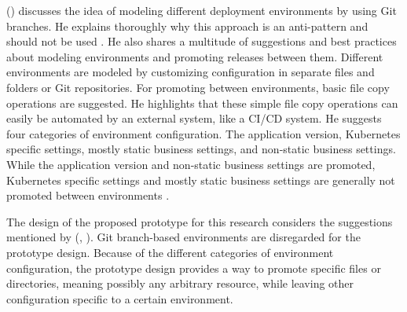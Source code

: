 \citeauthor{codefreshStopUsingBranchesGitOpsEnvironments} (\citeyear{codefreshStopUsingBranchesGitOpsEnvironments})
discusses
the idea of
modeling different deployment environments by using Git branches.
He
explains thoroughly why this approach is an anti-pattern and should not be used
\autocite{codefreshStopUsingBranchesGitOpsEnvironments}.
He
also shares
a multitude of suggestions and best practices
about modeling environments and promoting releases between them.
Different environments are modeled by customizing configuration in separate files and folders or Git repositories.
For promoting between environments, basic file copy operations are suggested.
He highlights that these simple file copy operations can easily be automated by an external system,
like a CI/CD system.
He
suggests four categories of environment configuration.
The application version,
Kubernetes specific settings,
mostly static business settings,
and 
non-static business settings.
While the application version and non-static business settings are promoted,
Kubernetes specific settings and mostly static business settings are generally not promoted between environments
\autocite{codefreshHowToModelGitOpsEnvironmentsAndPromote}.

The design of the proposed prototype for this research
considers the suggestions mentioned by
\citeauthor{codefreshHowToModelGitOpsEnvironmentsAndPromote} (\citeyear{codefreshStopUsingBranchesGitOpsEnvironments}, \citeyear{codefreshHowToModelGitOpsEnvironmentsAndPromote}).
Git branch-based environments are disregarded for the prototype design.
Because of the different categories of environment configuration,
the prototype design provides a way to promote specific files or directories,
meaning possibly any arbitrary resource,
while leaving other configuration specific to a certain environment.

